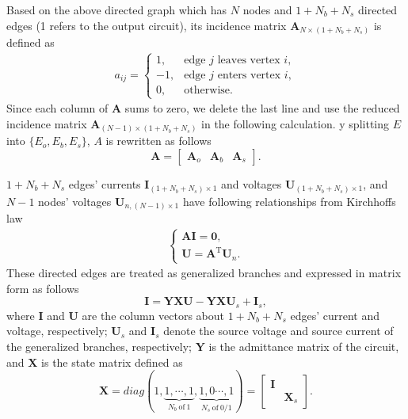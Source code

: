 \documentclass{article}
\def\T{\mathrm{T}}
\begin{document}
Based on the above directed graph which has $N$ nodes and $1+N_b+N_s$ directed edges (1 refers to the output circuit), its incidence matrix $\bm{A}_{N\times (1+N_b+N_s)}$ is defined as
\begin{align}\label{eq:A}
    a_{ij}=
    \begin{cases}
        1,  & \text{edge  $j$ leaves vertex $i$},\\
        -1, & \text{edge $j$ enters vertex $i$},\\
        0,  & \text{otherwise}.
    \end{cases}
\end{align}
Since each column of $\bm{A}$ sums to zero, we delete the last line and use the reduced incidence matrix $\bm{A}_{(N-1)\times(1+N_b+N_s)}$ in the following calculation.
y splitting $E$ into $\{E_o, E_b, E_s\}$, $A$ is rewritten as follows
\begin{equation}
    \bm{A} = 
    \begin{bmatrix}
        \bm{A}_o & \bm{A}_b & \bm{A}_s
    \end{bmatrix}.
\end{equation}


$1+N_b+N_s$ edges' currents $\bm{I}_{(1+N_b+N_s)\times 1}$ and voltages $\bm{U}_{(1+N_b+N_s)\times 1}$, and $N-1$ nodes' voltages $\bm{U}_{n, (N-1)\times 1}$ have following relationships from Kirchhoffs law
\begin{align}\label{eq:Kirchhoffs_law}
    \begin{cases}
    \bm{A} \bm{I} = \bm{0}, \\
    \bm{U}        = \bm{A}^\T \bm{U}_n.
    \end{cases}
\end{align}
These directed edges are treated as generalized branches and expressed in matrix form as follows
\begin{equation}\label{eq:generalized_branches}
    \bm{I} = \bm{Y}\bm{X} \bm{U} - \bm{Y}\bm{X} \bm{U}_s +\bm{I}_s,
\end{equation}
where $\bm{I}$ and $\bm{U}$ are the column vectors about $1+N_b+N_s$ edges' current and voltage, respectively; 
$\bm{U}_s$ and $\bm{I}_s$ denote the source voltage and source current of the generalized branches, respectively;
$\bm{Y}$ is the admittance matrix of the circuit, and $\bm{X}$ is the state matrix defined as
\begin{equation}\label{eq:X}
    \bm{X} = diag(
        1,  
        \underbrace{1, \cdots, 1}_{N_b~\text{of}~1}, 
        \underbrace{1, 0 \cdots, 1}_{N_s~\text{of}~0/1}
    )
    =\begin{bmatrix}
        \bm{I} &\\
         & \bm{X}_s
    \end{bmatrix}.
\end{equation}
\end{document}
